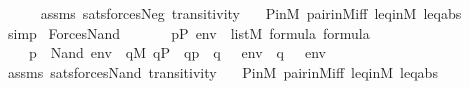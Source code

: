 \begin{isabellebody}
%
\isadelimproof
\ \ \ \ %
\endisadelimproof
%
\isatagproof
{}\isamarkupfalse%
\ assms\ sats{\isacharunderscore}{\kern0pt}forces{\isacharunderscore}{\kern0pt}Neg{\isacharprime}{\kern0pt}\ transitivity\ \isanewline
\ \ P{\isacharunderscore}{\kern0pt}in{\isacharunderscore}{\kern0pt}M\ pair{\isacharunderscore}{\kern0pt}in{\isacharunderscore}{\kern0pt}M{\isacharunderscore}{\kern0pt}iff\ leq{\isacharunderscore}{\kern0pt}in{\isacharunderscore}{\kern0pt}M\ leq{\isacharunderscore}{\kern0pt}abs\ \isamarkupfalse%
\ simp%
\endisatagproof
{\isafoldproof}%
%
\isadelimproof
%
\endisadelimproof
%
\isadelimdocument
%
\endisadelimdocument
%
\isatagdocument
%
\isamarkuptrue%
%
\endisatagdocument
{\isafolddocument}%
%
\isadelimdocument
%
\endisadelimdocument
{}\isamarkupfalse%
\ Forces{\isacharunderscore}{\kern0pt}Nand{\isacharcolon}{\kern0pt}\isanewline
\ \ \isanewline
\ \ \ \ {\isachardoublequoteopen}p{\isasymin}P{\isachardoublequoteclose}\ {\isachardoublequoteopen}env\ {\isasymin}\ list{\isacharparenleft}{\kern0pt}M{\isacharparenright}{\kern0pt}{\isachardoublequoteclose}\ {\isachardoublequoteopen}{\isasymphi}{\isasymin}formula{\isachardoublequoteclose}\ {\isachardoublequoteopen}{\isasympsi}{\isasymin}formula{\isachardoublequoteclose}\isanewline
\ \ \isanewline
\ \ \ \ {\isachardoublequoteopen}{\isacharparenleft}{\kern0pt}p\ {\isasymtturnstile}\ Nand{\isacharparenleft}{\kern0pt}{\isasymphi}{\isacharcomma}{\kern0pt}{\isasympsi}{\isacharparenright}{\kern0pt}\ env{\isacharparenright}{\kern0pt}\ {\isasymlongleftrightarrow}\ {\isasymnot}{\isacharparenleft}{\kern0pt}{\isasymexists}q{\isasymin}M{\isachardot}{\kern0pt}\ q{\isasymin}P\ {\isasymand}\ q{\isasympreceq}p\ {\isasymand}\ {\isacharparenleft}{\kern0pt}q\ {\isasymtturnstile}\ {\isasymphi}\ env{\isacharparenright}{\kern0pt}\ {\isasymand}\ {\isacharparenleft}{\kern0pt}q\ {\isasymtturnstile}\ {\isasympsi}\ env{\isacharparenright}{\kern0pt}{\isacharparenright}{\kern0pt}{\isachardoublequoteclose}\isanewline
%
\isadelimproof
\ \ \ %
\endisadelimproof
%
\isatagproof
{}\isamarkupfalse%
\ assms\ sats{\isacharunderscore}{\kern0pt}forces{\isacharunderscore}{\kern0pt}Nand{\isacharprime}{\kern0pt}\ transitivity\ \isanewline
\ \ P{\isacharunderscore}{\kern0pt}in{\isacharunderscore}{\kern0pt}M\ pair{\isacharunderscore}{\kern0pt}in{\isacharunderscore}{\kern0pt}M{\isacharunderscore}{\kern0pt}iff\ leq{\isacharunderscore}{\kern0pt}in{\isacharunderscore}{\kern0pt}M\ leq{\isacharunderscore}{\kern0pt}abs\ \isamarkupfalse%

\end{isabellebody}
